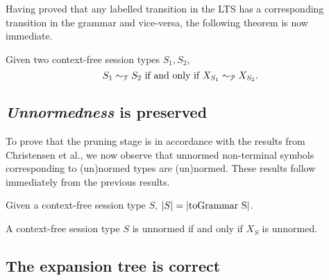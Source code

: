 Having proved that any labelled transition in the LTS has a corresponding
transition in the grammar and vice-versa, the following theorem is now
immediate.

\begin{theorem}
\label{cfst_vs_grammar}
	Given two context-free session types $S_1, S_2$,
	\[ S_1 \sim_{\mathcal T} S_2 \text{ if and only if } X_{S_1} \sim_{\mathcal P} X_{S_2}. \]
\end{theorem}

\subsection{\textit{Unnormedness} is preserved}

To prove that the pruning stage is in accordance with the results
from Christensen et al., we now observe that unnormed non-terminal symbols
corresponding to (un)normed types are (un)normed. These results follow
immediately from the previous results.

\begin{corollary}
	Given a context-free session type $S$, $|S| = |\text{\lstinline{toGrammar S}}|$.
\end{corollary}

\begin{corollary}
	A context-free session type $S$ is unnormed if and only if
	$X_S$ is unnormed.
\end{corollary}

\subsection{The expansion tree is correct}
%
%
%

